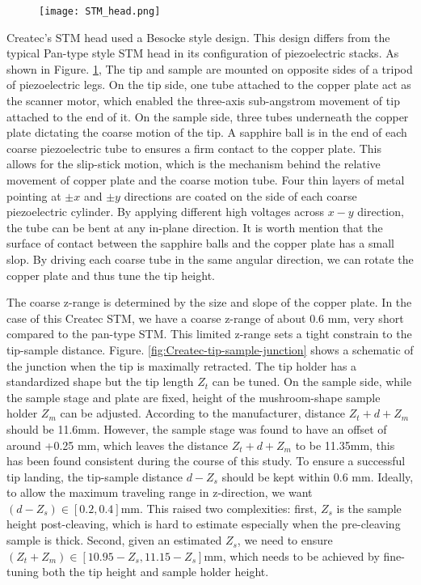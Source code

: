 \begin{figure}
	\centering
	\texttt{[image: STM\_head.png]}
	\caption{}
	\label{fig:STM_head}
\end{figure}

Createc's STM head used a Besocke style design\cite{besockeEasilyOperableScanning1987b}. This design differs from the typical Pan-type style STM head in its configuration of piezoelectric stacks. As shown in Figure. \ref{fig:STM_head}, The tip and sample are mounted on opposite sides of a tripod of piezoelectric legs. On the tip side, one tube attached to the copper plate act as the scanner motor, which enabled the three-axis sub-angstrom movement of tip attached to the end of it. On the sample side, three tubes underneath the copper plate dictating the coarse motion of the tip. A sapphire ball is in the end of each coarse piezoelectric tube to ensures a firm contact to the copper plate. This allows for the slip-stick motion, which is the mechanism behind the relative movement of copper plate and the coarse motion tube. Four thin layers of metal pointing at $\pm x$ and $\pm y$ directions are coated on the side of each coarse piezoelectric cylinder. By applying different high voltages across $x-y$ direction, the tube can be bent at any in-plane direction. It is worth mention that the surface of contact between the sapphire balls and the copper plate has a small slop. By driving each coarse tube in the same angular direction, we can rotate the copper plate and thus tune the tip height.

The coarse z-range is determined by the size and slope of the copper plate. In the case of this Createc \ac{STM}, we have a coarse z-range of about 0.6 mm, very short compared to the pan-type STM. This limited z-range sets a tight constrain to the tip-sample distance. Figure. \ref{fig:Createc-tip-sample-junction} shows a schematic of the junction when the tip is maximally retracted. The tip holder has a standardized shape but the tip length $Z_t$ can be tuned. On the sample side, while the sample stage and plate are fixed, height of the mushroom-shape sample holder $Z_m$ can be adjusted. According to the manufacturer, distance $Z_t + d +Z_m$ should be 11.6mm. However, the sample stage was found to have an offset of around +0.25 mm, which leaves the distance $Z_t + d +Z_m$ to be 11.35mm, this has been found consistent during the course of this study. To ensure a successful tip landing, the tip-sample distance $d-Z_s$ should be kept within 0.6 mm. Ideally, to allow the maximum traveling range in z-direction, we want $(d-Z_s) \in [0.2,0.4]$mm. This raised two complexities: first, $Z_s$ is the sample height post-cleaving, which is hard to estimate especially when the pre-cleaving sample is thick. Second, given an estimated $Z_s$, we need to ensure $(Z_t+Z_m)\in[10.95-Z_s, 11.15-Z_s]$mm, which needs to be achieved by fine-tuning both the tip height and sample holder height.  

